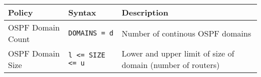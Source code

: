 \begin{table*}[thb]
\begin{small}
	\begin{center}
		\begin{tabular}{m{10em} | m{10em} | m{32em} } 
			Policy &  Syntax & Description \\ 
			\hline
			OSPF Domain Count & \texttt{DOMAINS = d} & Number of continous OSPF domains  \\ \hline
			OSPF Domain Size & \texttt{l <= SIZE  <= u } & Lower and upper
			limit of size of domain (number of routers)
			
		\end{tabular}
	\end{center}
	 \label{tab:configpolicysupport} 
\end{small}
\end{table*}
